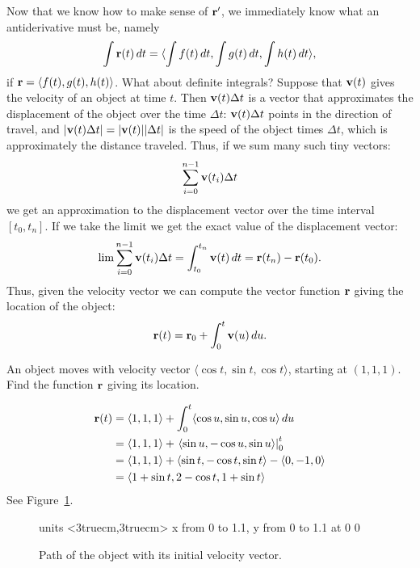 Now that we know how to make sense of ${\bf r}'$, we immediately know
what an antiderivative must be, namely
$$\int {\bf r}(t)\,dt = \langle \int f(t)\,dt,\int g(t)\,dt,\int h(t)\,dt
\rangle,$$ if ${\bf r}=\langle f(t),g(t),h(t)\rangle$. What about
definite integrals?  Suppose that ${\bf v}(t)$ gives the velocity of
an object at time $t$. Then ${\bf v}(t)\Delta t$ is a vector that
approximates the displacement of the object over the time $\Delta t$:
${\bf v}(t)\Delta t$ points in the direction of travel, and $|{\bf
  v}(t)\Delta t|=|{\bf v}(t)||\Delta t|$ is the speed of the object
times $\Delta t$, which is approximately the distance traveled. Thus,
if we sum many such tiny vectors:
$$\sum_{i=0}^{n-1}{\bf v}(t_i)\Delta t$$
we get an approximation to the displacement vector over the time
interval $[t_0,t_n]$. If we take the limit we get the exact
value of the displacement vector:
$$\lim\sum_{i=0}^{n-1}{\bf v}(t_i)\Delta t = \int_{t_0}^{t_n}{\bf
v}(t)\,dt = {\bf r}(t_n)-{\bf r}(t_0).$$
Thus, given the velocity vector we can compute the vector function
${\bf r}$ giving the location of the object:
$${\bf r}(t)={\bf r}_0+\int_0^t {\bf v}(u)\,du.$$

\begin{example}{}{}
An object moves with velocity vector $\langle \cos t, \sin t,
\cos t\rangle$, starting at $(1,1,1)$. Find the function
${\bf r}$ giving its location.
\end{example}
\begin{solution}
\begin{align*}
{\bf r}(t)&=\langle 1,1,1\rangle+\int_0^t \langle \cos u, \sin u,
\cos u\rangle\,du	\\
&=\langle 1,1,1\rangle+\left.\langle \sin u, -\cos u,\sin u\rangle
\right|_0^t	\\
&=\langle 1,1,1\rangle+\langle \sin t, -\cos t,\sin t\rangle-
\langle 0,-1,0\rangle	\\
&=\langle 1+\sin t, 2-\cos t,1+\sin t\rangle
\end{align*}
See Figure~\ref{fig:velocity cos sin cos}.
\end{solution}

\begin{figure}[H]
\centerline{
\vbox{\beginpicture
\normalgraphs
\setcoordinatesystem units <3truecm,3truecm>
\setplotarea x from 0 to 1.1, y from 0 to 1.1
 at 0 0
\endpicture}}
\caption{Path of the object with its initial velocity vector. \label{fig:velocity cos sin cos}}
\end{figure}


